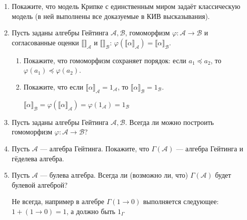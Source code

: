 \begin{enumerate}[wide, labelwidth=!, labelindent=0pt]
    \item Покажите, что модель Крипке с единственным миром задаёт классическую модель (в ней выполнены
          все доказуемые в КИВ высказывания).

    \item Пусть заданы алгебры Гейтинга $\mathcal{A},\mathcal{B}$, гомоморфизм $\varphi: \mathcal{A} \rightarrow \mathcal{B}$
          и согласованные оценки $\llbracket\rrbracket_\mathcal{A}$ и $\llbracket\rrbracket_\mathcal{B}$:
          $\varphi(\llbracket\alpha\rrbracket_\mathcal{A}) = \llbracket\alpha\rrbracket_\mathcal{B}$.
          \begin{enumerate}
              \item Покажите, что гомоморфизм сохраняет порядок: если $a_1\preceq a_2$, то $\varphi(a_1) \preceq \varphi(a_2)$.
              \item Покажите, что если $\llbracket \alpha \rrbracket_\mathcal{A} = 1_\mathcal{A}$, то $\llbracket\alpha\rrbracket_\mathcal{B} = 1_\mathcal{B}$.

                    \(\llbracket \alpha \rrbracket_{\mathcal{B}} = \varphi(\llbracket \alpha \rrbracket_{\mathcal{A}}) = \varphi(1_{\mathcal{A}}) = 1_{\mathcal{B}}\)
          \end{enumerate}

    \item Пусть заданы алгебры Гейтинга $\mathcal{A},\mathcal{B}$. Всегда ли можно построить гомоморфизм $\varphi: \mathcal{A}\rightarrow\mathcal{B}$?

    \item Пусть $\mathcal{A}$ --- алгебра Гейтинга. Покажите, что $\Gamma(\mathcal{A})$ --- алгебра Гейтинга и гёделева алгебра.

    \item Пусть $\mathcal{A}$ --- булева алгебра. Всегда ли (возможно ли, что) $\Gamma(\mathcal{A})$ будет булевой алгеброй?

          Не всегда, например в алгебре \(\Gamma(1 \to 0)\) выполняется следующее: \(1 + (1 \to 0) = 1\), а должно быть \(1_\Gamma\)
\end{enumerate}


